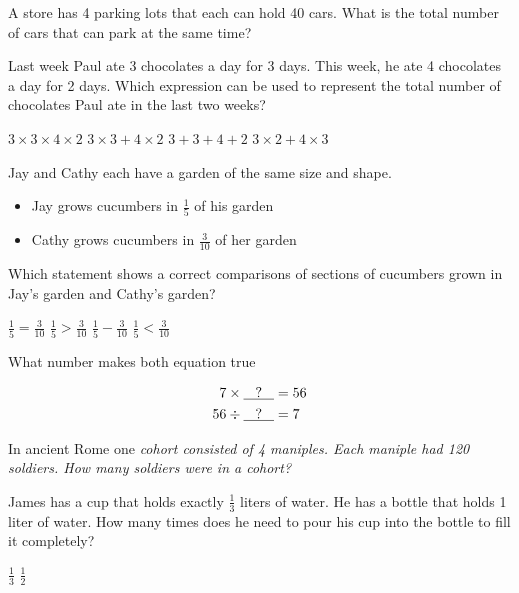 \documentclass{exam}
\newcommand{\qm}{\underline{\hspace{0.3cm}?\hspace{0.3cm}}}
\begin{document}
\begin{questions}
	\question
	A store has 4 parking lots that each can hold 40 cars. What is the total number of cars that can park at the same time?
	\begin{choices}
	\end{choices}

 \question  Last week Paul ate 3 chocolates a day for 3 days.  This week, he ate 4 chocolates a day for 2 days. Which expression can be used to represent the total number of chocolates Paul ate in the last two weeks?
 \begin{choices}
 	\choice $3 \times 3 \times 4 \times 2$
 	\choice $3 \times 3 + 4 \times 2$
 	\choice $3 + 3 + 4 + 2$
 	\choice $3 \times 2 + 4 \times 3$
 \end{choices}
 
 \question
 Jay and Cathy each have a garden of the same size and shape.  
 \begin{itemize}
 	\item Jay grows cucumbers in $\frac{1}{5}$ of his garden
 	\item Cathy grows cucumbers in $\frac{3}{10}$ of her garden
 \end{itemize}
 Which statement shows a correct comparisons of sections of cucumbers grown in Jay's garden and Cathy's garden?
 \begin{choices}
 \choice  $\frac{1}{5} = \frac{3}{10}$
 \choice  $\frac{1}{5} > \frac{3}{10}$
 \choice  $\frac{1}{5} - \frac{3}{10}$
 \choice  $\frac{1}{5} < \frac{3}{10}$
 \end{choices}

\question What number makes both equation true 

\begin{align*}
	7 \times \qm &= 56\\ 
	56 \div \qm &= 7
\end{align*}

\begin{choices}
\end{choices}

\question In ancient Rome one \em{cohort} consisted of 4 \em{maniples}.  Each maniple had 120 soldiers.  How many soldiers were in a cohort?
\begin{choices}
\end{choices}

\question James has a cup that holds exactly $\frac{1}{3}$ liters of water. He has a bottle that holds 1 liter of water.  How many times does he need to pour his cup into the bottle to fill it completely?
\begin{choices}
	\choice $\frac{1}{3}$
	\choice $\frac{1}{2}$
\end{choices}


\end{questions}
\end{document}
